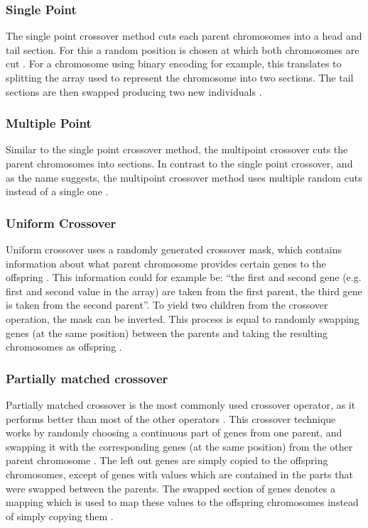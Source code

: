 \documentclass[sigconf]{acmart}
\begin{document}
\subsubsection{Single Point}
The single point crossover method cuts each parent chromosomes into a head and
tail section. For this a random position is chosen at which both chromosomes
are cut \cite{Affenzeller2009}.
For a chromosome using binary encoding for example, this translates to
splitting the array used to represent the chromosome into two sections.
The tail sections are then swapped producing two new individuals
\cite{Affenzeller2009}.

\subsubsection{Multiple Point}
Similar to the single point crossover method, the multipoint crossover
cuts the parent chromosomes into sections. In contrast to the single point
crossover, and as the name suggests, the multipoint crossover method
uses multiple random cuts instead of a single one
\cite{Affenzeller2009,Katoch2021}. 

\subsubsection{Uniform Crossover}
Uniform crossover uses a randomly generated crossover mask, which contains
information about what parent chromosome provides certain genes to the
offspring \cite{Affenzeller2009}. This information could for example be:
\enquote{the first and second gene (e.g. first and second value in the array)
are taken from the first parent, the third gene is taken from the second
parent}.
To yield two children from the crossover operation, the mask can be inverted.
This process is equal to randomly swapping genes (at the same position) between
the parents and taking the resulting chromosomes as offspring \cite{Katoch2021}.


\subsubsection{Partially matched crossover}
Partially matched crossover is the most commonly used crossover operator,
as it performs better than most of the other operators \cite{Katoch2021}.
This crossover technique works by randomly choosing a continuous part of genes
from one parent, and swapping it with the corresponding genes (at the same
position) from the other parent chromosome \cite{Katoch2021}.
The left out genes are simply copied to the offspring chromosomes, except of
genes with values which are contained in the parts that were swapped between
the parents. The swapped section of genes denotes a mapping which is used to
map these values to the offspring chromosomes instead of simply copying them
\cite{Katoch2021}.
\end{document}
